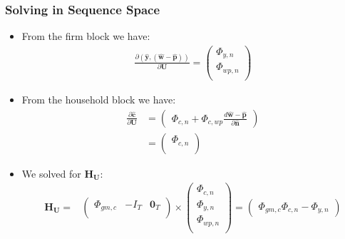 \documentclass[english,xcolor=svgnames]{beamer}
\begin{document}
	
	\begin{frame}
		\frametitle{Solving in Sequence Space}
			\begin{itemize}
				\item From the firm block we have:
				\begin{align*}
					\frac{\partial (\mathbf{\hat{y}},\mathbf{(\hat{w}-\hat{p})})}{\partial \mathbf{U}} = \begin{pmatrix}
						\Phi_{y,n} \\
						\Phi_{wp,n} \\
					\end{pmatrix}
				\end{align*}
				\item From the household block we have:
				\begin{align*}
					\frac{\partial \mathbf{\hat{c}}}{\partial \mathbf{U}} &= \begin{pmatrix}
						 \Phi_{c,n} + \Phi_{c,wp}\frac{d\mathbf{\hat{w}-\hat{p}}}{\partial \mathbf{\hat{n}} } 
					\end{pmatrix} \\
					&= \begin{pmatrix}
						\Phi_{c,n} \\
					\end{pmatrix}
				\end{align*}
				\item We solved for $\mathbf{H}_{\mathbf{U}}$:
				\begin{align*}
					\mathbf{H}_{\mathbf{U}} =&\begin{pmatrix}
						\Phi_{gm,c} & - I_T & \mathbf{0}_T  \\ 
					\end{pmatrix} \times  \begin{pmatrix}
						\Phi_{c,n} \\
						\Phi_{y,n} \\
						\Phi_{wp,n} \\
					\end{pmatrix}
					= \begin{pmatrix}
						\Phi_{gm,c}\Phi_{c,n} - \Phi_{y,n} 
					\end{pmatrix} 
				\end{align*}
			\end{itemize}
	\end{frame}
	
	
	
\end{document}

